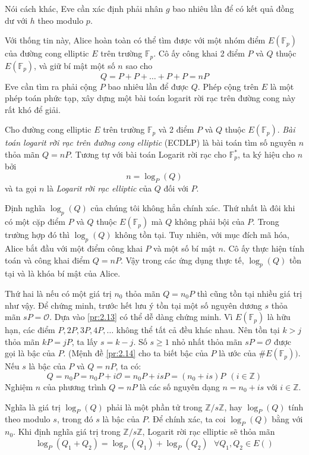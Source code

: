 Nói cách khác, Eve cần xác định phải nhân $g$ bao nhiêu lần để có kết quả đồng dư với $h$ theo modulo $p$.

Với thống tin này, Alice hoàn toàn có thể tìm được với một nhóm điểm $E(\mathbb{F}_p)$ của đường cong elliptic $E$ trên trường $\mathbb{F}_p$.
Cô ấy công khai 2 điểm $P$ và $Q$ thuộc $E(\mathbb{F}_p)$, và giữ bí mật một số $n$ sao cho
$$ Q = P+P+ \ldots +P+P = nP$$
Eve cần tìm ra phải cộng $P$ bao nhiêu lần để được $Q$. Phép cộng trên $E$ là một phép toán phức tạp, xây dựng một bài toán logarit rời rạc trên đường cong này rất khó để giải.

\begin{definition}
	Cho đường cong elliptic $E$ trên trường $\mathbb{F}_p$ và 2 điểm $P$ và $Q$ thuộc $E(\mathbb{F}_p)$. \textit{Bài toán logarit rời rạc trên đường cong elliptic} (ECDLP) là bài toán tìm số nguyên $n$ thỏa mãn $Q=nP$.
	Tương tự với bài toán Logarit rời rạc cho $\mathbb{F}^*_p$, ta ký hiệu cho $n$ bởi
	$$  n = \log_P(Q)$$
	và ta gọi $n$ là \textit{Logarit rời rạc elliptic} của $Q$ đối với $P$.
\end{definition}

\begin{remark}
	Định nghĩa $\log_p(Q)$ của chúng tôi không hẳn chính xác. Thứ nhất là đôi khi có một cặp điểm $P$ và $Q$ thuộc $E(\mathbb{F}_p)$ mà $Q$ không phải bội của $P$.
	Trong trường hợp đó thì $\log_p(Q)$  không tồn tại. Tuy nhiên, với mục đích mã hóa, Alice bắt đầu với một điểm công khai $P$ và một số bí mật $n$. Cô ấy thực hiện tính toán và công khai điểm $Q = nP$.
	Vậy trong các ứng dụng thực tế, $\log_p(Q)$ tồn tại và là khóa bí mật của Alice.

	Thứ hai là nếu có một giá trị $n_0$ thỏa mãn $Q=n_0P$ thì cũng tồn tại nhiều giá trị như vậy. Để chứng minh, trước hết lưu ý tồn tại một số nguyên dương $s$ thỏa mãn $sP = \mathcal{O}$. Dựa vào \ref{pr:2.13} có thể dễ dàng chứng minh.
	Vì $E(\mathbb{F}_p)$ là hữu hạn, các điểm $P, 2P, 3P, 4P, \ldots$ không thể tất cả đều khác nhau. Nên tồn tại $k > j$ thỏa mãn $kP = jP$, ta lấy $s = k-j$.
	Số $s \geq 1$ nhỏ nhất thỏa mãn $sP = \mathcal{O}$ được gọi là bậc của $P$. (Mệnh đề \ref{pr:2.14} cho ta biết bậc của $P$ là ước của $\#E(\mathbb{F}_p))$.
	Nếu $s$ là bậc của $P$ và $Q = nP$, ta có:
	$$ Q = n_0P = n_0P + i\mathcal{O} = n_0P + isP = (n_0+is)P \ \  (i\in \mathbb{Z})$$
	Nghiệm $n$ của phương trình $Q = nP$ là các số nguyên dạng $ n = n_0+is$ với $i\in \mathbb{Z}.$

	Nghĩa là giá trị $\log_P(Q)$ phải là một phần tử trong $\mathbb{Z}/s\mathbb{Z}$, hay $\log_P(Q)$ tính theo modulo $s$, trong đó $s$ là bậc của $P$.
	Để chính xác, ta coi $\log_P(Q)$ bằng với $n_0$. Khi định nghĩa giá trị trong $\mathbb{Z}/s\mathbb{Z}$, Logarit rời rạc elliptic sẽ thỏa mãn
	$$ \log_P(Q_1 + Q_2) = \log_P(Q_1) + \log_P(Q_2) \ \ \ \forall Q_1, Q_2 \in E()$$


\end{remark}